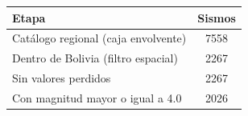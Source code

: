 \begin{tabular}{lc}
\toprule
Etapa & Sismos \\
\midrule
Catálogo regional (caja envolvente) & 7558 \\
Dentro de Bolivia (filtro espacial) & 2267 \\
Sin valores perdidos & 2267 \\
Con magnitud mayor o igual a 4.0 & 2026 \\
\bottomrule
\end{tabular}